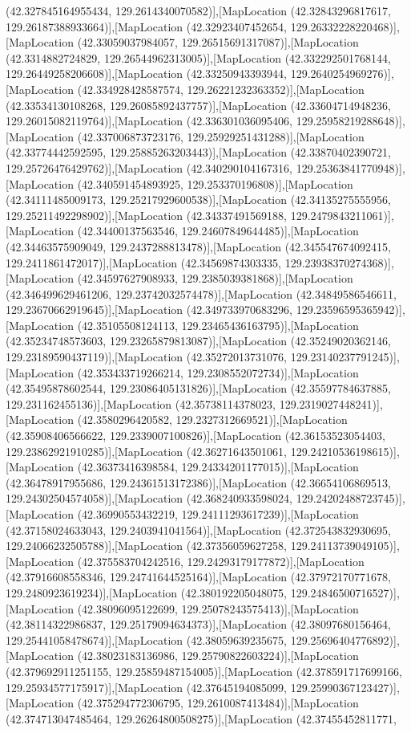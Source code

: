 (42.327845164955434, 129.2614340070582)],[MapLocation (42.32843296817617, 129.26187388933664)],[MapLocation (42.32923407452654, 129.26332228220468)],[MapLocation (42.33059037984057, 129.26515691317087)],[MapLocation (42.3314882724829, 129.26544962313005)],[MapLocation (42.332292501768144, 129.26449258206608)],[MapLocation (42.33250943393944, 129.2640254969276)],[MapLocation (42.334928428587574, 129.26221232363352)],[MapLocation (42.33534130108268, 129.26085892437757)],[MapLocation (42.33604714948236, 129.26015082119764)],[MapLocation (42.336301036095406, 129.25958219288648)],[MapLocation (42.337006873723176, 129.25929251431288)],[MapLocation (42.33774442592595, 129.25885263203443)],[MapLocation (42.33870402390721, 129.25726476429762)],[MapLocation (42.340290104167316, 129.25363841770948)],[MapLocation (42.340591454893925, 129.253370196808)],[MapLocation (42.34111485009173, 129.25217929600538)],[MapLocation (42.34135275555956, 129.25211492298902)],[MapLocation (42.34337491569188, 129.2479843211061)],[MapLocation (42.34400137563546, 129.24607849644485)],[MapLocation (42.34463575909049, 129.2437288813478)],[MapLocation (42.345547674092415, 129.2411861472017)],[MapLocation (42.34569874303335, 129.23938370274368)],[MapLocation (42.34597627908933, 129.2385039381868)],[MapLocation (42.346499629461206, 129.23742032574478)],[MapLocation (42.34849586546611, 129.23670662919645)],[MapLocation (42.349733970683296, 129.23596595365942)],[MapLocation (42.35105508124113, 129.23465436163795)],[MapLocation (42.35234748573603, 129.23265879813087)],[MapLocation (42.35249020362146, 129.23189590437119)],[MapLocation (42.35272013731076, 129.23140237791245)],[MapLocation (42.353433719266214, 129.2308552072734)],[MapLocation (42.35495878602544, 129.23086405131826)],[MapLocation (42.35597784637885, 129.231162455136)],[MapLocation (42.35738114378023, 129.2319027448241)],[MapLocation (42.3580296420582, 129.2327312669521)],[MapLocation (42.35908406566622, 129.2339007100826)],[MapLocation (42.36153523054403, 129.23862921910285)],[MapLocation (42.36271643501061, 129.24210536198615)],[MapLocation (42.36373416398584, 129.24334201177015)],[MapLocation (42.36478917955686, 129.24361513172386)],[MapLocation (42.36654106869513, 129.24302504574058)],[MapLocation (42.368240933598024, 129.24202488723745)],[MapLocation (42.36990553432219, 129.24111293617239)],[MapLocation (42.37158024633043, 129.2403941041564)],[MapLocation (42.372543832930695, 129.24066232505788)],[MapLocation (42.37356059627258, 129.24113739049105)],[MapLocation (42.375583704242516, 129.24293179177872)],[MapLocation (42.37916608558346, 129.24741644525164)],[MapLocation (42.37972170771678, 129.2480923619234)],[MapLocation (42.380192205048075, 129.24846500716527)],[MapLocation (42.38096095122699, 129.25078243575413)],[MapLocation (42.38114322986837, 129.25179094634373)],[MapLocation (42.38097680156464, 129.25441058478674)],[MapLocation (42.38059639235675, 129.25696404776892)],[MapLocation (42.38023183136986, 129.25790822603224)],[MapLocation (42.379692911251155, 129.25859487154005)],[MapLocation (42.378591717699166, 129.25934577175917)],[MapLocation (42.37645194085099, 129.25990367123427)],[MapLocation (42.375294772306795, 129.2610087413484)],[MapLocation (42.374713047485464, 129.26264800508275)],[MapLocation (42.37455452811771, 